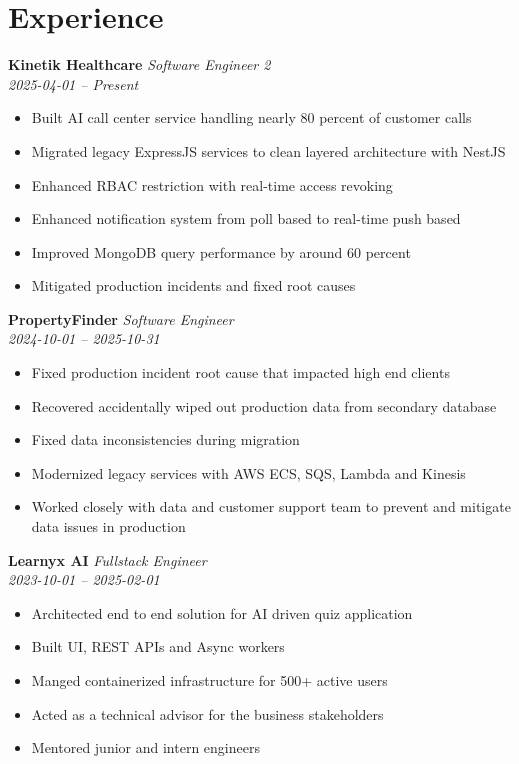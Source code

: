 \documentclass[a4paper,10pt]{article}
\begin{document}
\section*{Experience}
\textbf{Kinetik Healthcare} \hfill \textit{Software Engineer 2}\\
\textit{2025-04-01 -- Present}
\begin{itemize}
\item Built AI call center service handling nearly 80 percent of customer calls
\item Migrated legacy ExpressJS services to clean layered architecture with NestJS
\item Enhanced RBAC restriction with real-time access revoking
\item Enhanced notification system from poll based to real-time push based
\item Improved MongoDB query performance by around 60 percent
\item Mitigated production incidents and fixed root causes
\end{itemize}
\textbf{PropertyFinder} \hfill \textit{Software Engineer}\\
\textit{2024-10-01 -- 2025-10-31}
\begin{itemize}
\item Fixed production incident root cause that impacted high end clients
\item Recovered accidentally wiped out production data from secondary database
\item Fixed data inconsistencies during migration
\item Modernized legacy services with AWS ECS, SQS, Lambda and Kinesis
\item Worked closely with data and customer support team to prevent and mitigate data issues in production
\end{itemize}
\textbf{Learnyx AI} \hfill \textit{Fullstack Engineer}\\
\textit{2023-10-01 -- 2025-02-01}
\begin{itemize}
\item Architected end to end solution for AI driven quiz application
\item Built UI, REST APIs and Async workers
\item Manged containerized infrastructure for 500+ active users
\item Acted as a technical advisor for the business stakeholders
\item Mentored junior and intern engineers
\end{itemize}
\vspace{2pt}
\end{document}
